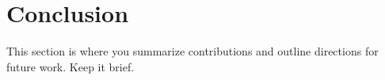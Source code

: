 \section{Conclusion}
\label{sec:conclusion}

This section is where you summarize contributions and outline directions for
future work. Keep it brief.
